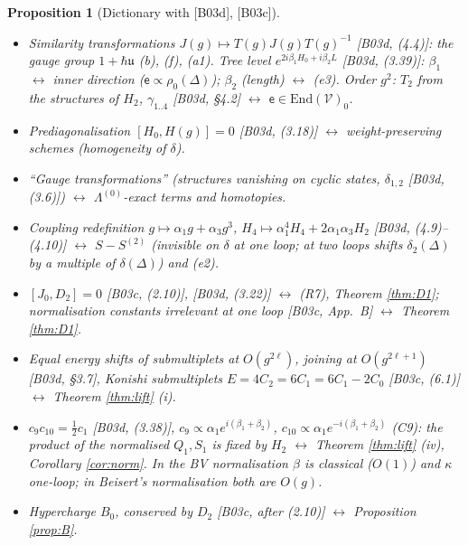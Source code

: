 \documentclass[10pt]{article}
\newtheorem{proposition}[theorem]{Proposition}
\theoremstyle{definition}
\newcommand{\V}{\mathcal V}
\newcommand{\End}{\mathrm{End}}
\newcommand{\ee}{\mathsf e}
\begin{document}
\begin{proposition}[Dictionary with {[B03d]}, {[B03c]}]\label{prop:beisert}\leavevmode
\begin{itemize}
\item Similarity transformations $J(g)\mapsto T(g)J(g)T(g)^{-1}$ [B03d, (4.4)]: the gauge group $1+\hbar\mathfrak u$ (b), (f), (a1). Tree level $e^{2i\beta_1H_0+i\beta_2L}$ [B03d, (3.39)]: $\beta_1$ $\leftrightarrow$ inner direction ($\ee\propto\rho_0(\Delta)$); $\beta_2$ (length) $\leftrightarrow$ (e3). Order $g^2$: $T_2$ from the structures of $H_2$, $\gamma_{1..4}$ [B03d, \S4.2] $\leftrightarrow$ $\ee\in\End(\V)_0$.
\item Prediagonalisation $[H_0,H(g)]=0$ [B03d, (3.18)] $\leftrightarrow$ weight-preserving schemes (homogeneity of $\delta$).
\item ``Gauge transformations'' (structures vanishing on cyclic states, $\delta_{1,2}$ [B03d, (3.6)]) $\leftrightarrow$ $\Lambda^{(0)}$-exact terms and homotopies.
\item Coupling redefinition $g\mapsto\alpha_1g+\alpha_3g^3$, $H_4\mapsto\alpha_1^4H_4+2\alpha_1\alpha_3H_2$ [B03d, (4.9)--(4.10)] $\leftrightarrow$ $S-S^{(2)}$ (invisible on $\delta$ at one loop; at two loops shifts $\delta_2(\Delta)$ by a multiple of $\delta(\Delta)$) and (e2).
\item $[J_0,D_2]=0$ [B03c, (2.10)], [B03d, (3.22)] $\leftrightarrow$ (R7), Theorem \ref{thm:D1}; normalisation constants irrelevant at one loop [B03c, App.~B] $\leftrightarrow$ Theorem \ref{thm:D1}.
\item Equal energy shifts of submultiplets at $O(g^{2\ell})$, joining at $O(g^{2\ell+1})$ [B03d, \S3.7], Konishi submultiplets $E=4C_2=6C_1=6C_1-2C_0$ [B03c, (6.1)] $\leftrightarrow$ Theorem \ref{thm:lift} (i).
\item $c_9c_{10}=\tfrac12c_1$ [B03d, (3.38)], $c_9\propto\alpha_1e^{i(\beta_1+\beta_2)}$, $c_{10}\propto\alpha_1e^{-i(\beta_1+\beta_2)}$ (C9): the product of the normalised $Q_1,S_1$ is fixed by $H_2$ $\leftrightarrow$ Theorem \ref{thm:lift} (iv), Corollary \ref{cor:norm}. In the BV normalisation $\beta$ is classical ($O(1)$) and $\kappa$ one-loop; in Beisert's normalisation both are $O(g)$.
\item Hypercharge $B_0$, conserved by $D_2$ [B03c, after (2.10)] $\leftrightarrow$ Proposition \ref{prop:B}.
\end{itemize}
\end{proposition}
\end{document}
